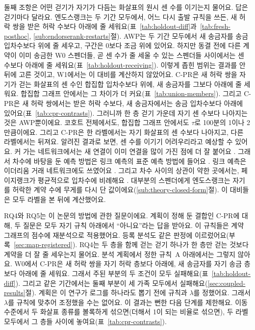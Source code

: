 둘째 조항은 어떤 걷기가 자기가 다듬는 화살표의 원시 센 수를 이기는지 물어요. 답은 걷기마다 달라요. 엔도스랭크는 두 기간 모두에서, 어느 다시 출발 규칙을 쓰든, 새 허락 쌍을 받은 허락 수보다 아래에 줄 세워요(표~\ref{tab:holdout-diff}과~\ref{tab:fresh-posthoc}, \ref{sub:endorserank-restarts}절). AWP는 두 기간 모두에서 새 송금자를 송금 입차수보다 위에 줄 세우고, 구간은 0보다 조금 위에 있어요. 하지만 동결 전에 다른 계약이 이미 송금한 W0 스펜더들, 곧 센 수가 줄 세울 수 있는 스펜더들 사이에서는 센 수보다 아래에 줄 세워요(표~\ref{tab:holdout-receiving}). 이렇게 좁힌 범위는 결과를 안 뒤에 고른 것이고, W1에서는 이 대비를 계산하지 않았어요. \mbox{C-PR}은 새 허락 쌍을 자기가 걷는 화살표의 센 수인 합집합 입차수보다 위에, 새 송금자를 그보다 아래에 줄 세워요. 합집합 그래프 안에서는 그 차이가 더 커요(표~\ref{tab:union-members}). 그리고 \mbox{C-PR}은 새 허락 쌍에서는 받은 허락 수보다, 새 송금자에서는 송금 입차수보다 아래에 있어요(표~\ref{tab:cpr-contrasts}). 그러니까 한 층 걷기 가운데 자기 센 수보다 나아지는 것은 AWP뿐이에요. 코호트 전체에서도, 합집합 그래프 안에서도 $\tau$로 100분의 1이나 2만큼이에요. 그리고 \mbox{C-PR}은 한 라벨에서는 자기 화살표의 센 수보다 나아지고, 다른 라벨에서는 뒤져요. 알려진 결과로 보면, 센 수를 이기기 어려우리라고 예상할 수 있어요. 커 가는 네트워크에서는 새 연결이 이미 연결을 많이 가진 점에 더 잘 붙어요 \parencite{barabasi1999scaling}. 그래서 차수에 바탕을 둔 예측 방법은 링크 예측의 표준 예측 방법에 들어요 \parencite{libennowell2007link}. 링크 예측은 이더리움 거래 네트워크에도 쓰였어요 \parencite{lin2022tracking}. 그리고 차수 사이의 상관이 약한 곳에서는, 페이지랭크가 평균적으로 입차수에 비례해요 \parencite{fortunato2008indegree}. 대부분의 스펜더에게 엔도스랭크는 자기를 허락한 계약 수에 무게를 다시 단 값이에요(\ref{sub:theory-closed-form}절). 이 대비들은 모두 라벨을 본 뒤에 계산했어요.


RQ4와 RQ5는 이 논문의 방법에 관한 질문이에요. 계획이 정해 둔 결합인 \mbox{C-PR}에 대해, 두 질문은 모두 자기 규칙 아래에서 “아니요”라는 답을 받아요. 이 규칙들은 계약 그래프의 점수에 재분석으로 적용했어요. 등록 분석도 같은 판정에 이르렀어요(부록~\ref{sec:map-registered}). RQ4는 두 층을 함께 걷는 걷기 하나가 한 층만 걷는 것보다 계약을 더 잘 줄 세우는지 물어요. 분석 계획에서 정한 규칙~A 아래에서는 그렇지 않아요. W0에서 \mbox{C-PR}은 새 허락 쌍을 자기 허락 층보다 아래에, 새 송금자를 자기 송금 층보다 아래에 줄 세워요. 그래서 주된 부분의 두 조건이 모두 실패해요(표~\ref{tab:holdout-diff}). 그리고 같은 기간에서는 둘째 부분이 세 가족 모두에서 실패해요(\ref{sec:coupled-results}절). 계획은 이 연구가 로그를 하나라도 뽑기 전에 규칙과 $\lambda$를 정했어요. 그래서 $\lambda$를 규칙에 맞추어 조정했을 수는 없어요. 이 결과는 뻔한 다음 단계를 제한해요. 이동 수준에서 두 화살표 종류를 볼록하게 섞으면(더해서 1이 되는 비율로 섞으면), 두 라벨 모두에서 그 층들 사이에 놓여요(표~\ref{tab:cpr-contrasts}).

